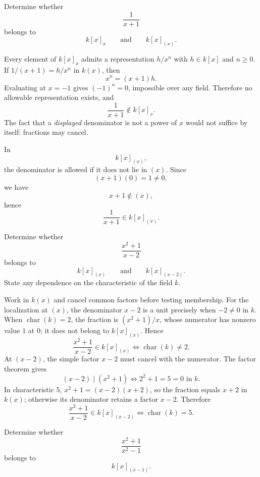\begin{problem}[CP-V-0060]
\label{prob:cp-v-0060}
Determine whether
\[
\frac{1}{x+1}
\]
belongs to
\[
k[x]_x
\qquad\text{and}\qquad
k[x]_{(x)}.
\]
\end{problem}

\begin{solution}
Every element of \(k[x]_x\) admits a representation \(h/x^n\)
with \(h\in k[x]\) and \(n\ge0\). If
\(1/(x+1)=h/x^n\) in \(k(x)\), then
\[
x^n=(x+1)h.
\]
Evaluating at \(x=-1\) gives \((-1)^n=0\), impossible over any
field. Therefore no allowable representation exists, and
\[
\frac{1}{x+1}\notin k[x]_x.
\]
The fact that a \emph{displayed} denominator is not a power of
\(x\) would not suffice by itself: fractions may cancel.

In
\[
k[x]_{(x)},
\]
the denominator is allowed if it does not lie in \((x)\). Since
\[
(x+1)(0)=1\neq 0,
\]
we have
\[
x+1\notin (x),
\]
hence
\[
\frac{1}{x+1}\in k[x]_{(x)}.
\]
\end{solution}


\begin{problem}[CP-V-0061]
\label{prob:cp-v-0061}
Determine whether
\[
\frac{x^2+1}{x-2}
\]
belongs to
\[
k[x]_{(x)}
\qquad\text{and}\qquad
k[x]_{(x-2)}.
\]
State any dependence on the characteristic of the field $k$.
\end{problem}

\begin{solution}
Work in $k(x)$ and cancel common factors before testing membership.
For the localization at $(x)$, the denominator $x-2$ is a unit precisely
when $-2\ne0$ in $k$. When $\operatorname{char}(k)=2$, the fraction is
$(x^2+1)/x$, whose numerator has nonzero value $1$ at $0$; it does not
belong to $k[x]_{(x)}$. Hence
\[
\boxed{\frac{x^2+1}{x-2}\in k[x]_{(x)}
\iff \operatorname{char}(k)\ne2.}
\]
At $(x-2)$, the simple factor $x-2$ must cancel with the numerator.
The factor theorem gives
\[
(x-2)\mid(x^2+1)\iff 2^2+1=5=0\text{ in }k.
\]
In characteristic $5$, $x^2+1=(x-2)(x+2)$, so the fraction equals
$x+2$ in $k(x)$; otherwise its denominator retains a factor $x-2$.
Therefore
\[
\boxed{\frac{x^2+1}{x-2}\in k[x]_{(x-2)}
\iff\operatorname{char}(k)=5.}
\]
\end{solution}


\begin{problem}[CP-V-0062]
\label{prob:cp-v-0062}
Determine whether
\[
\frac{x^2+1}{x^2-1}
\]
belongs to
\[
k[x]_{(x-1)}.
\]
\end{problem}

